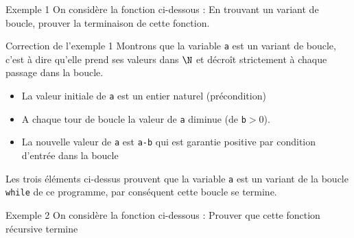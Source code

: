 \documentclass[10pt]{beamer}
\begin{document}
\begin{frame}[fragile]{\Ctitle}{\stitle}
\begin{exampleblock}{Exemple 1}
    On considère la fonction ci-dessous :
     En trouvant un variant de boucle, prouver la terminaison de cette fonction.
\end{exampleblock}
\end{frame}

\begin{frame}[fragile]{\Ctitle}{\stitle}
\begin{exampleblock}{Correction de l'exemple 1}
    \textcolor{OliveGreen}{Montrons que la variable {\tt a} est un variant de boucle, c'est à dire qu'elle prend ses valeurs dans $\N$ et  décroît strictement à chaque passage dans la boucle.}
    \begin{itemize}
        \item<2->{\textcolor{OliveGreen}{La valeur initiale de \texttt{a} est un entier naturel (précondition)}}
        \item<3->{\textcolor{OliveGreen}{A chaque tour de boucle la valeur de \texttt{a} diminue (de \texttt{b}$>0$).}}
        \item<4->{\textcolor{OliveGreen}{La nouvelle valeur de \texttt{a} est \texttt{a-b} qui est garantie positive par condition d'entrée dans la boucle}}
    \end{itemize}
    \textcolor{OliveGreen}{Les trois éléments ci-dessus prouvent que la variable {\tt a} est un variant de la boucle {\tt while} de ce programme, par conséquent cette boucle se termine.}
\end{exampleblock}
\end{frame}

\begin{frame}[fragile]{\Ctitle}{\stitle}
    \begin{exampleblock}{Exemple 2}
        On considère la fonction ci-dessous :
         Prouver que cette fonction récursive termine
    \end{exampleblock}
    \end{frame}
    
\end{document}

